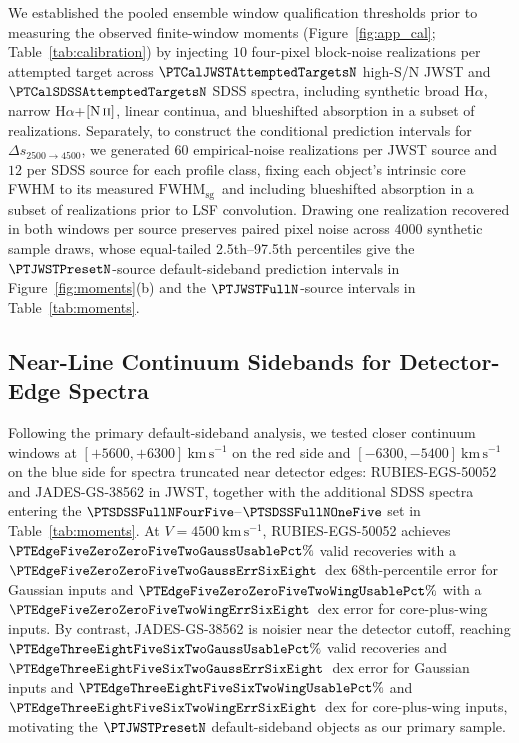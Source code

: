 \documentclass[twocolumn]{aastex631}
\newcommand{\Ha}{\ensuremath{\mathrm{H}\alpha}}
\newcommand{\NII}{\ensuremath{[\mathrm{N\,\textsc{ii}}]}}
\newcommand{\kms}{\ensuremath{\mathrm{km\,s^{-1}}}}
\newcommand{\FWHMsg}{\ensuremath{\mathrm{FWHM}_{\mathrm{sg}}}}
\begin{document}
We established the pooled ensemble window qualification thresholds prior to measuring the observed finite-window moments (Figure~\ref{fig:app_cal}; Table~\ref{tab:calibration}) by injecting $10$ four-pixel block-noise realizations per attempted target across $\PTCalJWSTAttemptedTargetsN$ high-S/N JWST and $\PTCalSDSSAttemptedTargetsN$ SDSS spectra, including synthetic broad \Ha, narrow \Ha+\NII, linear continua, and blueshifted absorption in a subset of realizations. Separately, to construct the conditional prediction intervals for $\Delta s_{2500\to 4500}$, we generated $60$ empirical-noise realizations per JWST source and $12$ per SDSS source for each profile class, fixing each object's intrinsic core FWHM to its measured \FWHMsg\ and including blueshifted absorption in a subset of realizations prior to LSF convolution. Drawing one realization recovered in both windows per source preserves paired pixel noise across $4000$ synthetic sample draws, whose equal-tailed 2.5th--97.5th percentiles give the $\PTJWSTPresetN$-source default-sideband prediction intervals in Figure~\ref{fig:moments}(b) and the $\PTJWSTFullN$-source intervals in Table~\ref{tab:moments}.

\subsection{Near-Line Continuum Sidebands for Detector-Edge Spectra}
\label{app:edge}

Following the primary default-sideband analysis, we tested closer continuum windows at $[+5600, +6300]~\kms$ on the red side and $[-6300, -5400]~\kms$ on the blue side for spectra truncated near detector edges: RUBIES-EGS-50052 and JADES-GS-38562 in JWST, together with the additional SDSS spectra entering the $\PTSDSSFullNFourFive$--$\PTSDSSFullNOneFive$ set in Table~\ref{tab:moments}. At $V = 4500~\kms$, RUBIES-EGS-50052 achieves $\PTEdgeFiveZeroZeroFiveTwoGaussUsablePct\%$ valid recoveries with a $\PTEdgeFiveZeroZeroFiveTwoGaussErrSixEight$~dex 68th-percentile error for Gaussian inputs and $\PTEdgeFiveZeroZeroFiveTwoWingUsablePct\%$ with a $\PTEdgeFiveZeroZeroFiveTwoWingErrSixEight$~dex error for core-plus-wing inputs. By contrast, JADES-GS-38562 is noisier near the detector cutoff, reaching $\PTEdgeThreeEightFiveSixTwoGaussUsablePct\%$ valid recoveries and $\PTEdgeThreeEightFiveSixTwoGaussErrSixEight$~dex error for Gaussian inputs and $\PTEdgeThreeEightFiveSixTwoWingUsablePct\%$ and $\PTEdgeThreeEightFiveSixTwoWingErrSixEight$~dex for core-plus-wing inputs, motivating the $\PTJWSTPresetN$ default-sideband objects as our primary sample.
\end{document}
